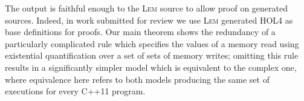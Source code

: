 \documentclass[a4paper]{llncs}
\newcommand{\Lem}{\textsc{Lem}}
\begin{document}
\par{}

\noindent The output is faithful enough to the \Lem{} source to allow proof on
generated sources. Indeed, in work submitted for review \cite{popl12}
we use \Lem{} generated HOL4 as base definitions for proofs.  Our main theorem
shows the redundancy of a particularly complicated rule which
specifies the values of a memory read using existential quantification over a
set of sets of memory writes; omitting this rule results in a significantly
simpler model which is equivalent to the complex one, where equivalence here
refers to both models producing the same set of executions for every C++11
program.
\end{document}
